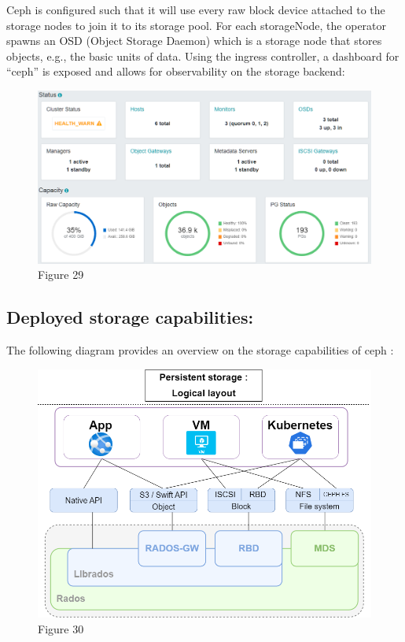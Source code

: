 Ceph is configured such that it will use every raw block device attached to the storage nodes to join it to its storage pool. For each storageNode, the operator spawns an OSD (Object Storage Daemon) which is a storage node that stores objects, e.g., the basic units of data.  
Using the ingress controller, a dashboard for “ceph” is exposed and allows for observability on the storage backend: 
\begin{figure}[H]\centering
\includegraphics[width=1.0\textwidth,angle=00]{assets/f29.png}
\caption{Figure 29 }
\label{fig:f29}
\end{figure}

\subsection{Deployed storage capabilities: }

The following diagram provides an overview on the storage capabilities of ceph : 
\begin{figure}[H]\centering
\includegraphics[width=1.0\textwidth,angle=00]{assets/f30.png}
\caption{Figure 30 }
\label{fig:f30}
\end{figure}

